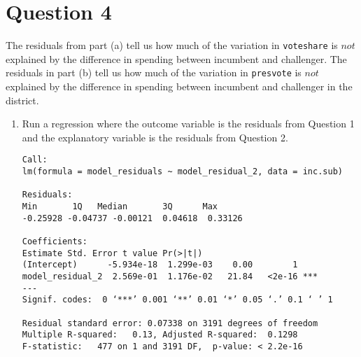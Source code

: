 \documentclass[12pt,letterpaper]{article}
\begin{document}
\newpage	
\section*{Question 4}
\noindent The residuals from part (a) tell us how much of the variation in \texttt{voteshare} is $not$ explained by the difference in spending between incumbent and challenger. The residuals in part (b) tell us how much of the variation in \texttt{presvote} is $not$ explained by the difference in spending between incumbent and challenger in the district.
	\begin{enumerate}
		\item Run a regression where the outcome variable is the residuals from Question 1 and the explanatory variable is the residuals from Question 2.	\vspace{0.2cm}
		
		\begin{Verbatim}
Call:
lm(formula = model_residuals ~ model_residual_2, data = inc.sub)

Residuals:
Min       1Q   Median       3Q      Max 
-0.25928 -0.04737 -0.00121  0.04618  0.33126 

Coefficients:
Estimate Std. Error t value Pr(>|t|)    
(Intercept)      -5.934e-18  1.299e-03    0.00        1    
model_residual_2  2.569e-01  1.176e-02   21.84   <2e-16 ***
---
Signif. codes:  0 ‘***’ 0.001 ‘**’ 0.01 ‘*’ 0.05 ‘.’ 0.1 ‘ ’ 1

Residual standard error: 0.07338 on 3191 degrees of freedom
Multiple R-squared:   0.13,	Adjusted R-squared:  0.1298 
F-statistic:   477 on 1 and 3191 DF,  p-value: < 2.2e-16


\end{Verbatim}
\end{enumerate}
\end{document}
